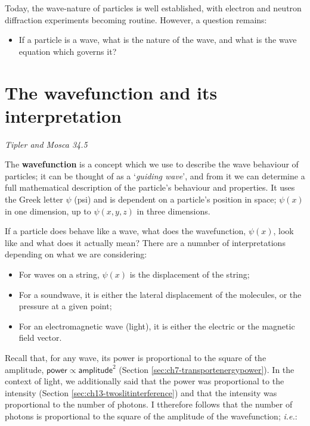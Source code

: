 \documentclass[
]{book}
\providecommand{\tightlist}{%
  \setlength{\itemsep}{0pt}\setlength{\parskip}{0pt}}
\begin{document}
Today, the wave-nature of particles is well established, with electron and neutron diffraction experiments becoming routine. However, a question remains:

\begin{itemize}
\tightlist
\item
  If a particle is a wave, what is the nature of the wave, and what is the wave equation which governs it?
\end{itemize}

\hypertarget{sec:ch17-wavefunction1}{%
\section{The wavefunction and its interpretation}\label{sec:ch17-wavefunction1}}

\emph{Tipler and Mosca 34.5}

The \textbf{wavefunction} is a concept which we use to describe the wave behaviour of particles; it can be thought of as a `\emph{guiding wave}', and from it we can determine a full mathematical description of the particle's behaviour and properties. It uses the Greek letter \(\psi\) (psi) and is dependent on a particle's position in space; \(\psi(x)\) in one dimension, up to \(\psi(x,y,z)\) in three dimensions.

If a particle does behave like a wave, what does the wavefunction, \(\psi(x)\), look like and what does it actually mean? There are a numnber of interpretations depending on what we are considering:

\begin{itemize}
\tightlist
\item
  For waves on a string, \(\psi(x)\) is the displacement of the string;
\item
  For a soundwave, it is either the lateral displacement of the molecules, or the pressure at a given point;
\item
  For an electromagnetic wave (light), it is either the electric or the magnetic field vector.
\end{itemize}

Recall that, for any wave, its power is proportional to the square of the amplitude, \(\textsf{power} \propto \textsf{amplitude}^2\) (Section \ref{sec:ch7-transportenergypower}). In the context of light, we additionally said that the power was proportional to the intensity (Section \ref{sec:ch13-twoslitinterference}) and that the intensity was proportional to the number of photons. I ttherefore follows that the number of photons is proportional to the square of the amplitude of the wavefunction; \emph{i.e.}:
\end{document}
